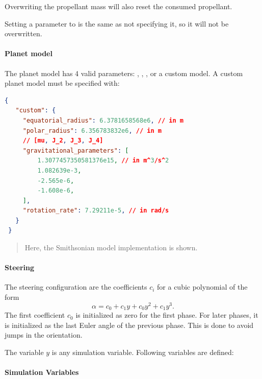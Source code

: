 Overwriting the propellant mass will also reset the consumed propellant.

Setting a parameter to  is the same as not specifying it, so it will not be overwritten.

\paragraph{Planet model}

The planet model has 4 valid parameters:
, , , or a custom model. A custom planet model must be
specified with:

\begin{lstlisting}[language=json]
 {
   "custom": {
     "equatorial_radius": 6.3781658568e6, // in m
     "polar_radius": 6.356783832e6, // in m
     // [mu, J_2, J_3, J_4]
     "gravitational_parameters": [
         1.3077457350581376e15, // in m^3/s^2
         1.082639e-3,
         -2.565e-6,
         -1.608e-6,
     ],
     "rotation_rate": 7.29211e-5, // in rad/s
   }
 }
\end{lstlisting}

\begin{quote} Here, the Smithsonian model implementation is shown.
\end{quote}

\paragraph{Steering}

The steering configuration are the coefficients \(c_i\) for a cubic
polynomial of the form \[
  \alpha = c_0 + c_1y + c_0y^2 + c_1y^3.
\] The first coefficient \(c_0\) is initialized as zero for the first
phase. For later phases, it is initialized as the last Euler angle of
the previous phase. This is done to avoid jumps in the orientation.

The variable \(y\) is any simulation variable. Following variables are
defined:

\paragraph{Simulation Variables}

